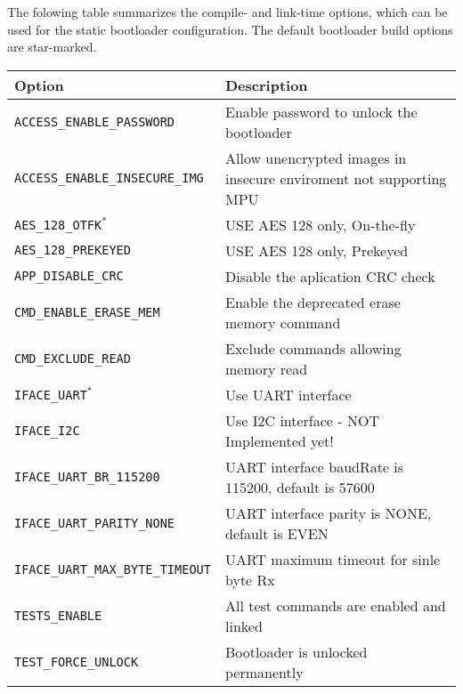   The folowing table summarizes the compile- and link-time options, which can be used for the static bootloader configuration.
  The default bootloader build options are star-marked.

  \begin{table*}[!ht]
    \hspace*{-4cm}
    \begin{tabular}{| p{5.5cm} | p{7.5cm} |}
        \hline
        \rowcolor{SeaGreen3!30!} {\bf Option} & {\bf Description} \\
        \hline
        \hline
        \texttt{ACCESS\_ENABLE\_PASSWORD} & Enable password to unlock the bootloader \\
        \hline
        \texttt{ACCESS\_ENABLE\_INSECURE\_IMG} & Allow unencrypted images in insecure enviroment not supporting MPU\footnotemark \\
        \hline
        \texttt{AES\_128\_OTFK$^*$} & USE AES 128 only, On-the-fly \\
        \hline
        \texttt{AES\_128\_PREKEYED} & USE AES 128 only, Prekeyed \\
        \hline
        \texttt{APP\_DISABLE\_CRC} & Disable the aplication CRC check \\
        \hline
        \texttt{CMD\_ENABLE\_ERASE\_MEM} & Enable the deprecated erase memory command \\
        \hline
        \texttt{CMD\_EXCLUDE\_READ} & Exclude commands allowing memory read \\
        \hline
        \texttt{IFACE\_UART$^*$} & Use UART interface\\
        \hline
        \texttt{IFACE\_I2C} & Use I2C interface - NOT Implemented yet!\\
        \hline
        \texttt{IFACE\_UART\_BR\_115200} & UART interface baudRate is 115200, default is 57600\\
        \hline
        \texttt{IFACE\_UART\_PARITY\_NONE} & UART interface parity is NONE, default is EVEN\\
        \hline
        \texttt{IFACE\_UART\_MAX\_BYTE\_TIMEOUT} & UART maximum timeout for sinle byte Rx\\
        \hline
        \texttt{TESTS\_ENABLE} & All test commands are enabled and linked\\
        \hline
        \texttt{TEST\_FORCE\_UNLOCK} & Bootloader is unlocked permanently \\
        \hline
    \end{tabular}
    \label{tab:cmdset}
   \end{table*}
   
